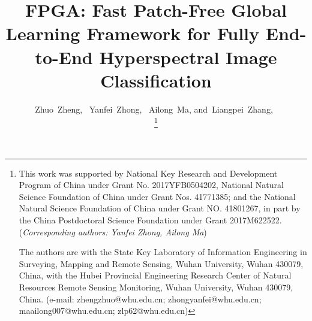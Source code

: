 \documentclass[journal]{IEEEtran}
\begin{document}
\title{FPGA: Fast Patch-Free Global Learning Framework for Fully End-to-End Hyperspectral Image Classification}


\author{{Zhuo~Zheng,~
      Yanfei~Zhong,~
      Ailong~Ma,
      and~Liangpei~Zhang,~}


  \thanks{
    This work was supported by National Key Research and Development Program of China under Grant No. 2017YFB0504202, National Natural Science Foundation of China under Grant Nos. 41771385; and the National Natural Science Foundation of China under Grant NO. 41801267, in part by the China Postdoctoral Science Foundation under Grant 2017M622522.
    (\textit{Corresponding authors: Yanfei Zhong, Ailong Ma})

    The authors are with the State Key Laboratory of Information Engineering in Surveying, Mapping and Remote Sensing, Wuhan University, Wuhan 430079, China, with the Hubei Provincial Engineering Research Center of Natural Resources Remote Sensing Monitoring, Wuhan University, Wuhan 430079, China.
    (e-mail: zhengzhuo@whu.edu.cn; zhongyanfei@whu.edu.cn; maailong007@whu.edu.cn; zlp62@whu.edu.cn)
  }}






\maketitle
\end{document}
